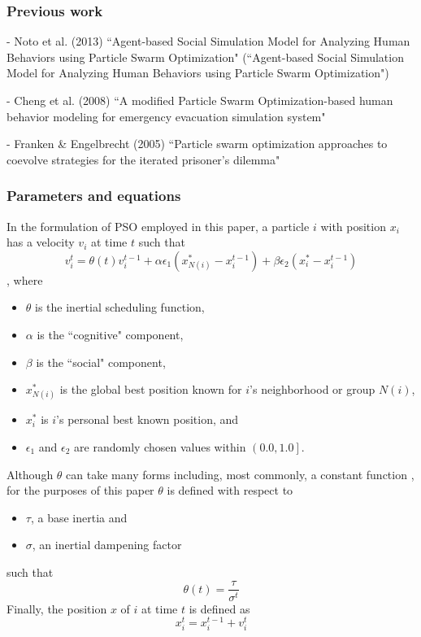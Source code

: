 \documentclass[12pt]{article}
\begin{document}


\subsubsection{Previous work}
- Noto et al. (2013) ``Agent-based Social Simulation Model for Analyzing Human Behaviors using Particle Swarm Optimization" (``Agent-based Social Simulation Model for Analyzing Human Behaviors using Particle Swarm Optimization")

- Cheng et al. (2008) ``A modified Particle Swarm Optimization-based human behavior modeling for emergency evacuation simulation system"

- Franken \& Engelbrecht (2005) ``Particle swarm optimization approaches to coevolve strategies for the iterated prisoner's dilemma"

\subsubsection{Parameters and equations}
In the formulation of PSO employed in this paper, a particle $i$ with position $x_i$ has a velocity $v_i$ at time $t$ such that
\[
v_i^t = \theta(t) v_i^{t-1} + \alpha \epsilon_1 (x_{N(i)}^* - x_i^{t-1}) + \beta \epsilon_2 (x_i^* - x_i^{t-1})
\],
where 
\begin{itemize}
\item $\theta$ is the inertial scheduling function, 
\item $\alpha$ is the ``cognitive" component, 
\item $\beta$ is the ``social" component, 
\item $x_{N(i)}^*$ is the global best position known for $i$'s neighborhood or group $N(i)$, 
\item $x_i^*$ is $i$'s personal best known position, and 
\item $\epsilon_1$ and $\epsilon_2$ are randomly chosen values within $\left(0.0, 1.0\right]$. 
\end{itemize}
Although $\theta$ can take many forms including, most commonly, a constant function \citep[p.~101]{yang2014}, for the purposes of this paper $\theta$ is defined with respect to 
\begin{itemize}
\item $\tau$, a base inertia and 
\item $\sigma$, an inertial dampening factor
\end{itemize}
such that
\[
\theta(t) = \frac{\tau}{\sigma^t} 
\]
Finally, the position $x$ of $i$ at time $t$ is defined as
\[
x_i^t = x_i^{t-1} + v_i^t 
\]
\end{document}
